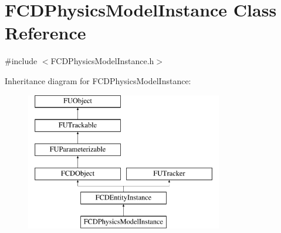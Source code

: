 \hypertarget{classFCDPhysicsModelInstance}{
\section{FCDPhysicsModelInstance Class Reference}
\label{classFCDPhysicsModelInstance}
}


{\ttfamily \#include $<$FCDPhysicsModelInstance.h$>$}

Inheritance diagram for FCDPhysicsModelInstance:\begin{figure}[H]
\begin{center}
\leavevmode
\includegraphics[height=6.000000cm]{classFCDPhysicsModelInstance}
\end{center}
\end{figure}
